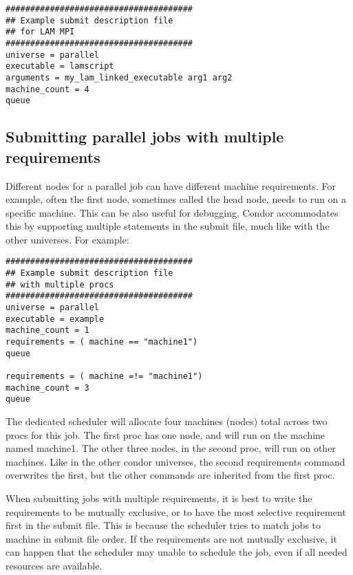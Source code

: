 \begin{verbatim}
######################################
## Example submit description file
## for LAM MPI
######################################
universe = parallel
executable = lamscript
arguments = my_lam_linked_executable arg1 arg2
machine_count = 4
queue
\end{verbatim}

\subsection{\label{sec:parallel-multi-proc}Submitting parallel jobs with multiple requirements}
Different nodes for a parallel job can have different machine
requirements.  For example, often the first node, sometimes called the
head node, needs to run on a specific machine.  This can be also
useful for debugging.  Condor accommodates this by supporting multiple
 statements in the submit file, much like with the other
universes.  For example:

\begin{verbatim}
######################################
## Example submit description file
## with multiple procs
######################################
universe = parallel
executable = example
machine_count = 1
requirements = ( machine == "machine1")
queue

requirements = ( machine =!= "machine1")
machine_count = 3
queue
\end{verbatim}

The dedicated scheduler will allocate four machines (nodes) total across
two procs for this job.  The first proc has one node,
 and will run on the machine named machine1.  The 
other three nodes, in the second proc, will run on other machines.  
Like in the other condor universes, the second requirements command 
overwrites the first, but the other commands are inherited from the 
first proc.

When submitting jobs with multiple requirements, it is
best to write the requirements to be mutually exclusive,
or to have the most selective requirement first in the submit file.
This is because the scheduler tries to match jobs to machine in
submit file order.  If the requirements are not mutually exclusive,
it can happen that the scheduler may unable to schedule the job, even
if all needed resources are available.

